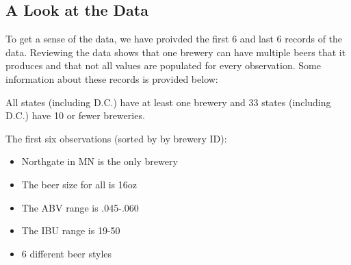 \documentclass[]{article}
\newenvironment{Shaded}{\begin{snugshade}}{\end{snugshade}}
\newcommand{\CommentTok}[1]{\textcolor[rgb]{0.56,0.35,0.01}{\textit{#1}}}
\newcommand{\DataTypeTok}[1]{\textcolor[rgb]{0.13,0.29,0.53}{#1}}
\newcommand{\KeywordTok}[1]{\textcolor[rgb]{0.13,0.29,0.53}{\textbf{#1}}}
\newcommand{\NormalTok}[1]{#1}
\newcommand{\StringTok}[1]{\textcolor[rgb]{0.31,0.60,0.02}{#1}}
\providecommand{\tightlist}{%
  \setlength{\itemsep}{0pt}\setlength{\parskip}{0pt}}
\begin{document}
\begin{Shaded}
\end{Shaded}

\hypertarget{a-look-at-the-data}{%
\subsection{A Look at the Data}\label{a-look-at-the-data}}

To get a sense of the data, we have proivded the first 6 and last 6
records of the data. Reviewing the data shows that one brewery can have
multiple beers that it produces and that not all values are populated
for every observation. Some information about these records is provided
below:

All states (including D.C.) have at least one brewery and 33 states
(including D.C.) have 10 or fewer breweries.

The first six observations (sorted by by brewery ID):

\begin{itemize}
\tightlist
\item
  Northgate in MN is the only brewery
\item
  The beer size for all is 16oz
\item
  The ABV range is .045-.060
\item
  The IBU range is 19-50
\item
  6 different beer styles
\end{itemize}
\end{document}
